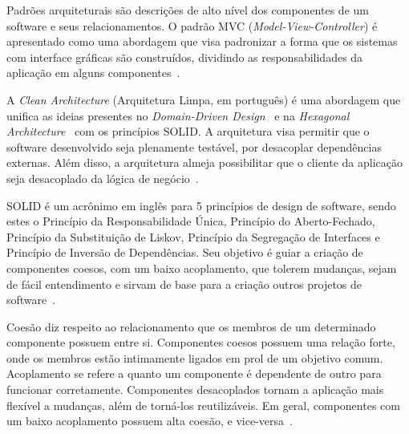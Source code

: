 Padrões arquiteturais são descrições de alto nível dos componentes de um software e seus relacionamentos.
O padrão MVC (\emph{Model-View-Controller}) é apresentado como uma abordagem que visa padronizar a forma que os sistemas com interface gráficas são construídos, dividindo as responsabilidades da aplicação em alguns componentes~\cite{mvc-paper}.

A \emph{Clean Architecture} (Arquitetura Limpa, em português) é uma abordagem que unifica as ideias presentes no \emph{Domain-Driven Design}~\cite{ddd-book} e na \emph{Hexagonal Architecture}~\cite{hexagonal-arch} com os princípios SOLID\@.
A arquitetura visa permitir que o software desenvolvido seja plenamente testável, por desacoplar dependências externas.
Além disso, a arquitetura almeja possibilitar que o cliente da aplicação seja desacoplado da lógica de negócio~\cite{clean-arch-book}.

SOLID é um acrônimo em inglês para 5 princípios de design de software, sendo estes o Princípio da Responsabilidade Única, Princípio do Aberto-Fechado, Princípio da Substituição de Liskov, Princípio da Segregação de Interfaces e Princípio de Inversão de Dependências.
Seu objetivo é guiar a criação de componentes coesos, com um baixo acoplamento, que tolerem mudanças, sejam de fácil entendimento e sirvam de base para a criação outros projetos de software~\cite{clean-arch-book}.

Coesão diz respeito ao relacionamento que os membros de um determinado componente possuem entre si.
Componentes coesos possuem uma relação forte, onde os membros estão intimamente ligados em prol de um objetivo comum.
Acoplamento se refere a quanto um componente é dependente de outro para funcionar corretamente.
Componentes desacoplados tornam a aplicação mais flexível a mudanças, além de torná-los reutilizáveis.
Em geral, componentes com um baixo acoplamento possuem alta coesão, e vice-versa~\cite{coupling-and-cohesion}.